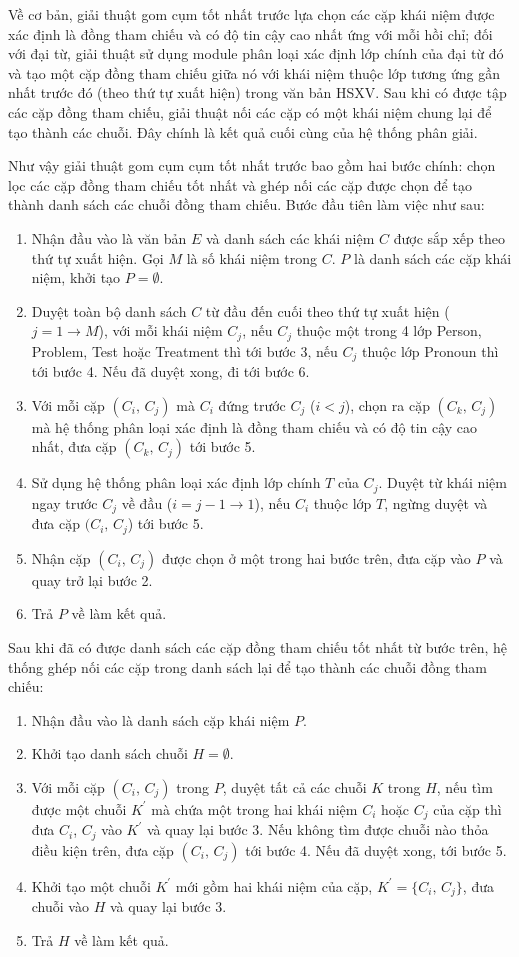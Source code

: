 Về cơ bản, giải thuật gom cụm tốt nhất trước lựa chọn các cặp khái niệm được xác định là đồng tham chiếu và có độ tin cậy cao nhất ứng với mỗi hồi chỉ; đối với đại từ, giải thuật sử dụng module phân loại xác định lớp chính của đại từ đó và tạo một cặp đồng tham chiếu giữa nó với khái niệm thuộc lớp tương ứng gần nhất trước đó (theo thứ tự xuất hiện) trong văn bản HSXV. Sau khi có được tập các cặp đồng tham chiếu, giải thuật nối các cặp có một khái niệm chung lại để tạo thành các chuỗi. Đây chính là kết quả cuối cùng của hệ thống phân giải.

Như vậy giải thuật gom cụm cụm tốt nhất trước bao gồm hai bước chính: chọn lọc các cặp đồng tham chiếu tốt nhất và ghép nối các cặp được chọn để tạo thành danh sách các chuỗi đồng tham chiếu. Bước đầu tiên làm việc như sau:
\begin{enumerate}
\item Nhận đầu vào là văn bản $E$ và danh sách các khái niệm $C$ được sắp xếp theo thứ tự xuất hiện. Gọi $M$ là số khái niệm trong $C$. $P$ là danh sách các cặp khái niệm, khởi tạo $P=\emptyset$.
\item Duyệt toàn bộ danh sách $C$ từ đầu đến cuối theo thứ tự xuất hiện ($j=1\rightarrow M$), với mỗi khái niệm $C_j$, nếu $C_j$ thuộc một trong 4 lớp Person, Problem, Test hoặc Treatment thì tới bước 3, nếu $C_j$ thuộc lớp Pronoun thì tới bước 4. Nếu đã duyệt xong, đi tới bước 6.
\item Với mỗi cặp $(C_i,\,C_j)$ mà $C_i$ đứng trước $C_j$ ($i<j$), chọn ra cặp $(C_k,\,C_j)$ mà hệ thống phân loại xác định là đồng tham chiếu và có độ tin cậy cao nhất, đưa cặp $(C_k,\,C_j)$ tới bước 5.
\item Sử dụng hệ thống phân loại xác định lớp chính $T$ của $C_j$. Duyệt từ khái niệm ngay trước $C_j$ về đầu ($i=j-1\rightarrow 1$), nếu $C_i$ thuộc lớp $T$, ngừng duyệt và đưa cặp $(C_i,\,C_j$) tới bước 5.
\item Nhận cặp $(C_i,\,C_j)$ được chọn ở một trong hai bước trên, đưa cặp vào $P$ và quay trở lại bước 2.
\item Trả $P$ về làm kết quả.
\end{enumerate} 

Sau khi đã có được danh sách các cặp đồng tham chiếu tốt nhất từ bước trên, hệ thống ghép nối các cặp trong danh sách lại để tạo thành các chuỗi đồng tham chiếu:
\begin{enumerate}
\item Nhận đầu vào là danh sách cặp khái niệm $P$.
\item Khởi tạo danh sách chuỗi $H=\emptyset$.
\item Với mỗi cặp $(C_i,\,C_j)$ trong $P$, duyệt tất cả các chuỗi $K$ trong $H$, nếu tìm được một chuỗi $K^{\prime}$ mà chứa một trong hai khái niệm $C_i$ hoặc $C_j$ của cặp thì đưa $C_i$, $C_j$ vào $K^{\prime}$ và quay lại bước 3. Nếu không tìm được chuỗi nào thỏa điều kiện trên, đưa cặp $(C_i,\,C_j)$ tới bước 4. Nếu đã duyệt xong, tới bước 5.
\item Khởi tạo một chuỗi $K^{\prime}$ mới gồm hai khái niệm của cặp, $K^{\prime}=\{C_i,\,C_j\}$, đưa chuỗi vào $H$ và quay lại bước 3.
\item Trả $H$ về làm kết quả.
\end{enumerate}

